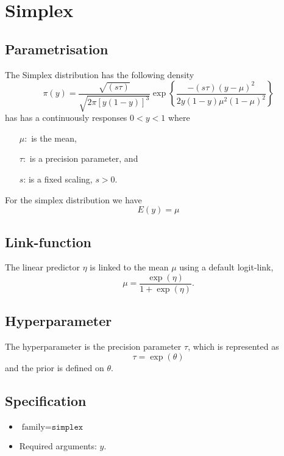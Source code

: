 \documentclass[a4paper,11pt]{article}
\begin{document}
\section*{Simplex}

\subsection*{Parametrisation}

The Simplex distribution has the following density
\begin{displaymath}
\pi(y)=\frac{\sqrt{(s\tau)}}{\sqrt{2\pi[y(1-y)]^3}}\exp\left\{\frac{-(s\tau)
      (y-\mu)^2}{2y(1-y)\mu^2(1-\mu)^2} \right\}
\end{displaymath}
has has a continuously responses $ 0<y<1$ where
\begin{itemize}
\item[$\mu:$] is the mean,
\item[$\tau:$] is a precision parameter, and
\item[$s$:] is a fixed scaling, $s>0$.    
\end{itemize}
For the simplex distribution we have 
\begin{displaymath}
E(y) = \mu 
\end{displaymath}

\subsection*{Link-function}
The linear predictor $\eta$ is linked to the mean $\mu$ using a
default logit-link,
\begin{displaymath}
    \mu = \frac{\exp{(\eta)}}{1+\exp{(\eta)}}.
\end{displaymath}

\subsection*{Hyperparameter}

The hyperparameter is the precision parameter $\tau$, which is
represented as
\begin{displaymath}
    \tau = \exp(\theta)
\end{displaymath}
and the prior is defined on $\theta$. 

\subsection*{Specification}

\begin{itemize}
\item $\text{family}=\texttt{simplex}$
\item Required arguments: $y$.
\end{itemize}
\end{document}
